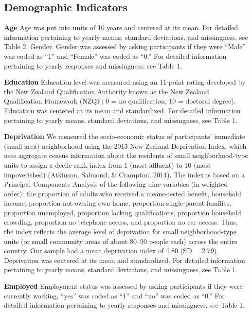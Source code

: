 \documentclass[
  english,
  man]{apa6}
\begin{document}
\hypertarget{demographic-indicators}{%
\subsection{Demographic Indicators}\label{demographic-indicators}}

\textbf{Age} Age was put into units of 10 years and centered at its mean. For detailed information pertaining to yearly means, standard deviations, and missingness, see Table 2.
Gender. Gender was assessed by asking participants if they were \enquote{Male} was coded as \enquote{1} and \enquote{Female} was coded as \enquote{0.} For detailed information pertaining to yearly responses and missingness, see Table 1.

\textbf{Education} Education level was measured using an 11-point rating developed by the New Zealand Qualification Authority known as the New Zealand Qualification Framework (NZQF; 0 = no qualification, 10 = doctoral degree). Education was centered at its mean and standardized. For detailed information pertaining to yearly means, standard deviations, and missingness, see Table 1.

\textbf{Deprivation} We measured the socio-economic status of participants' immediate (small area) neighborhood using the 2013 New Zealand Deprivation Index, which uses aggregate census information about the residents of small neighborhood-type units to assign a decile-rank index from 1 (most affluent) to 10 (most impoverished) (Atkinson, Salmond, \& Crampton, 2014). The index is based on a Principal Components Analysis of the following nine variables (in weighted order): the proportion of adults who received a means-tested benefit, household income, proportion not owning own home, proportion single-parent families, proportion unemployed, proportion lacking qualifications, proportion household crowding, proportion no telephone access, and proportion no car access. Thus, the index reflects the average level of deprivation for small neighborhood-type units (or small community areas of about 80--90 people each) across the entire country. Our sample had a mean deprivation index of 4.80 (SD = 2.79). Deprivation was centered at its mean and standardized. For detailed information pertaining to yearly means, standard deviations, and missingness, see Table 1.

\textbf{Employed} Employment status was assessed by asking participants if they were currently working, \enquote{yes} was coded as \enquote{1} and \enquote{no} was coded as \enquote{0.} For detailed information pertaining to yearly responses and missingness, see Table 1.
\end{document}
